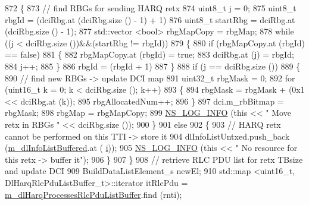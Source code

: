 \begin{DoxyCode}
872             \{
873               \textcolor{comment}{// find RBGs for sending HARQ retx}
874               uint8\_t j = 0;
875               uint8\_t rbgId = (dciRbg.at (dciRbg.size () - 1) + 1) %
876               uint8\_t startRbg = dciRbg.at (dciRbg.size () - 1);
877               std::vector <bool> rbgMapCopy = rbgMap;
878               \textcolor{keywordflow}{while} ((j < dciRbg.size ())&&(startRbg != rbgId))
879                 \{
880                   \textcolor{keywordflow}{if} (rbgMapCopy.at (rbgId) == \textcolor{keyword}{false})
881                     \{
882                       rbgMapCopy.at (rbgId) = \textcolor{keyword}{true};
883                       dciRbg.at (j) = rbgId;
884                       j++;
885                     \}
886                   rbgId = (rbgId + 1) %
887                 \}
888               \textcolor{keywordflow}{if} (j == dciRbg.size ())
889                 \{
890                   \textcolor{comment}{// find new RBGs -> update DCI map}
891                   uint32\_t rbgMask = 0;
892                   \textcolor{keywordflow}{for} (uint16\_t k = 0; k < dciRbg.size (); k++)
893                     \{
894                       rbgMask = rbgMask + (0x1 << dciRbg.at (k));
895                       rbgAllocatedNum++;
896                     \}
897                   dci.m\_rbBitmap = rbgMask;
898                   rbgMap = rbgMapCopy;
899                   \hyperlink{group__logging_gafbd73ee2cf9f26b319f49086d8e860fb}{NS\_LOG\_INFO} (\textcolor{keyword}{this} << \textcolor{stringliteral}{" Move retx in RBGs "} << dciRbg.size ());
900                 \}
901               \textcolor{keywordflow}{else}
902                 \{
903                   \textcolor{comment}{// HARQ retx cannot be performed on this TTI -> store it}
904                   dlInfoListUntxed.push\_back (\hyperlink{classns3_1_1TdMtFfMacScheduler_a4237ad4223d377a1c9963a904acbe4ad}{m\_dlInfoListBuffered}.at (
      \hyperlink{bernuolliDistribution_8m_a6f6ccfcf58b31cb6412107d9d5281426}{i}));
905                   \hyperlink{group__logging_gafbd73ee2cf9f26b319f49086d8e860fb}{NS\_LOG\_INFO} (\textcolor{keyword}{this} << \textcolor{stringliteral}{" No resource for this retx -> buffer it"});
906                 \}
907             \}
908           \textcolor{comment}{// retrieve RLC PDU list for retx TBsize and update DCI}
909           BuildDataListElement\_s newEl;
910           std::map <uint16\_t, DlHarqRlcPduListBuffer\_t>::iterator itRlcPdu =  
      \hyperlink{classns3_1_1TdMtFfMacScheduler_a5c8ba74976d19c98462ea970613b644b}{m\_dlHarqProcessesRlcPduListBuffer}.find (rnti);

\end{DoxyCode}
